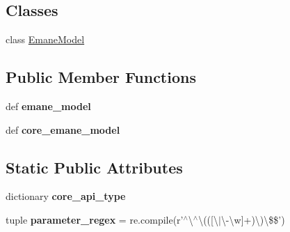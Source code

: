 \subsection*{Classes}
\begin{DoxyCompactItemize}
\item 
class \hyperlink{classemanemanifest2core_1_1_emane_manifest2_model_1_1_emane_model}{Emane\+Model}
\end{DoxyCompactItemize}
\subsection*{Public Member Functions}
\begin{DoxyCompactItemize}
\item 
\hypertarget{classemanemanifest2core_1_1_emane_manifest2_model_add1834a8d67f9f908ab68206463bd440}{def {\bfseries emane\+\_\+model}}\label{classemanemanifest2core_1_1_emane_manifest2_model_add1834a8d67f9f908ab68206463bd440}

\item 
\hypertarget{classemanemanifest2core_1_1_emane_manifest2_model_ac73240e290f539fec8df1759ab5a49e4}{def {\bfseries core\+\_\+emane\+\_\+model}}\label{classemanemanifest2core_1_1_emane_manifest2_model_ac73240e290f539fec8df1759ab5a49e4}

\end{DoxyCompactItemize}
\subsection*{Static Public Attributes}
\begin{DoxyCompactItemize}
\item 
dictionary {\bfseries core\+\_\+api\+\_\+type}
\item 
\hypertarget{classemanemanifest2core_1_1_emane_manifest2_model_a3b655f82e21ea7fdb856a3b3b7b52e77}{tuple {\bfseries parameter\+\_\+regex} = re.\+compile(r'$^\wedge$\textbackslash{}$^\wedge$\textbackslash{}((\mbox{[}\textbackslash{}$\vert$\textbackslash{}-\/\textbackslash{}w\mbox{]}+)\textbackslash{})\textbackslash{}\$\$')}\label{classemanemanifest2core_1_1_emane_manifest2_model_a3b655f82e21ea7fdb856a3b3b7b52e77}

\end{DoxyCompactItemize}


